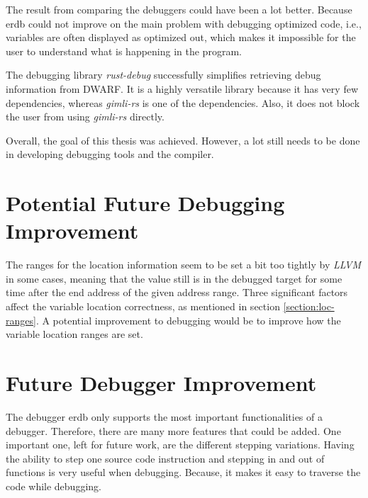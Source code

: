 


The result from comparing the debuggers could have been a lot better.
Because \gls{erdb} could not improve on the main problem with debugging optimized code, i.e., variables are often displayed as optimized out, which makes it impossible for the user to understand what is happening in the program.


The debugging library \emph{rust-debug} successfully simplifies retrieving debug information from \gls{DWARF}.
It is a highly versatile library because it has very few dependencies, whereas \emph{gimli-rs} is one of the dependencies.
Also, it does not block the user from using \emph{gimli-rs} directly.


Overall, the goal of this thesis was achieved.
However, a lot still needs to be done in developing debugging tools and the compiler.



\section{Potential Future Debugging Improvement}
The ranges for the location information seem to be set a bit too tightly by \emph{LLVM} in some cases, meaning that the value still is in the debugged target for some time after the end address of the given address range.
Three significant factors affect the variable location correctness, as mentioned in section \ref{section:loc-ranges}.
A potential improvement to debugging would be to improve how the variable location ranges are set.



\section{Future Debugger Improvement}
The debugger \gls{erdb} only supports the most important functionalities of a debugger.
Therefore, there are many more features that could be added.
One important one, left for future work, are the different stepping variations.
Having the ability to step one source code instruction and stepping in and out of functions is very useful when debugging.
Because, it makes it easy to traverse the code while debugging.



